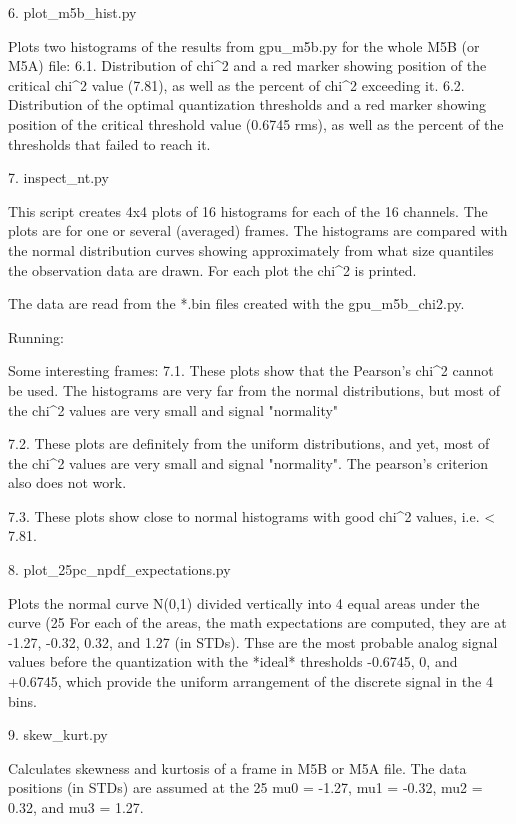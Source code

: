 \documentclass[letterpaper,twoside,12pt]{article}
\begin{document}
6. plot_m5b_hist.py

Plots two histograms of the results from gpu_m5b.py for the whole 
M5B (or M5A) file: 
6.1. Distribution of chi^2 and a red marker showing position of the critical
     chi^2 value (7.81), as well as the percent of chi^2 exceeding it.
6.2. Distribution of the optimal quantization thresholds and a red marker
     showing position of the critical threshold value (0.6745 rms), as well as
     the percent of the thresholds that failed to reach it.


7. inspect_nt.py

This script creates 4x4 plots of 16 histograms for each of the 16 channels.
The plots are for one or several (averaged) frames. The histograms are compared
with the normal distribution curves showing approximately from what size
quantiles the observation data are drawn. For each plot the chi^2 is printed.

The data are read from the *.bin files created with the gpu_m5b_chi2.py.

Running:


Some interesting frames:
7.1. These plots show that the Pearson's chi^2 cannot be used. The histograms 
are very far from the normal distributions, but most of the chi^2 values
are very small and signal "normality"

7.2. These plots are definitely from the uniform distributions, and yet, most
of the chi^2 values are very small and signal "normality". The pearson's
criterion also does not work.

7.3. These plots show close to normal histograms with good chi^2 values, i.e.
< 7.81.


8. plot_25pc_npdf_expectations.py

Plots the normal curve N(0,1) divided vertically into 4 equal areas under the 
curve (25%
For each of the areas, the math expectations are computed, they are at 
    -1.27, -0.32, 0.32, and 1.27 (in STDs). 
Thse are the most probable analog signal values before the quantization with
the *ideal* thresholds -0.6745, 0, and +0.6745, which provide the uniform 
arrangement of the discrete signal in the 4 bins.  


9. skew_kurt.py

Calculates skewness and kurtosis of a frame in M5B or M5A file.
The data positions (in STDs) are assumed at the 25%
  mu0 = -1.27, mu1 = -0.32, mu2 = 0.32, and mu3 = 1.27.
\end{document}
